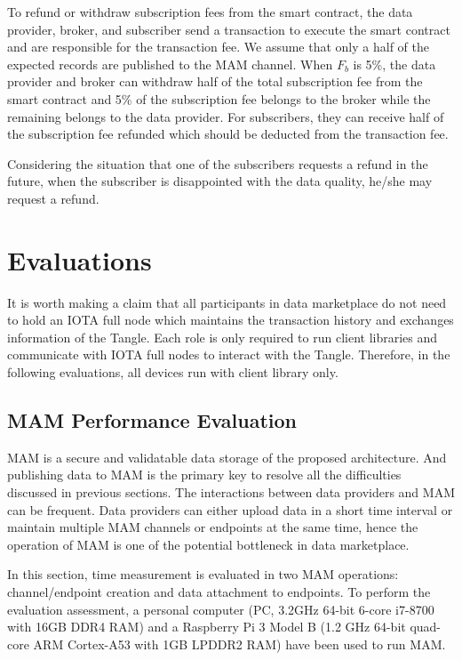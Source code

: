 \documentclass[conference]{IEEEtran}
\begin{document}
To refund or withdraw subscription fees from the smart contract, the data provider, broker, and subscriber send a transaction to execute the smart contract and are responsible for the transaction fee. We assume that only a half of the expected records are published to the MAM channel. When $F_{b}$ is 5\%, the data provider and broker can withdraw half of the total subscription fee from the smart contract and 5\% of the subscription fee belongs to the broker while the remaining belongs to the data provider. For subscribers, they can receive half of the subscription fee refunded which should be deducted from the transaction fee.

Considering the situation that one of the subscribers requests a refund in the future, when the subscriber is disappointed with the data quality, he/she may request a refund.

\section{Evaluations}
It is worth making a claim that all participants in data marketplace do not need to hold an IOTA full node which maintains the transaction history and exchanges information of the Tangle. Each role is only required to run client libraries and communicate with IOTA full nodes to interact with the Tangle. Therefore, in the following evaluations, all devices run with client library only.

\subsection{MAM Performance Evaluation}
MAM is a secure and validatable data storage of the proposed architecture. And publishing data to MAM is the primary key to resolve all the difficulties discussed in previous sections. The interactions between data providers and MAM can be frequent. Data providers can either upload data in a short time interval or maintain multiple MAM channels or endpoints at the same time, hence the operation of MAM is one of the potential bottleneck in data marketplace.

In this section, time measurement is evaluated in two MAM operations: channel/endpoint creation and data attachment to endpoints. To perform the evaluation assessment, a personal computer (PC, 3.2GHz 64-bit 6-core i7-8700 with 16GB DDR4 RAM) and a Raspberry Pi 3 Model B (1.2 GHz 64-bit quad-core ARM Cortex-A53 with 1GB LPDDR2 RAM) have been used to run MAM. 
\end{document}
